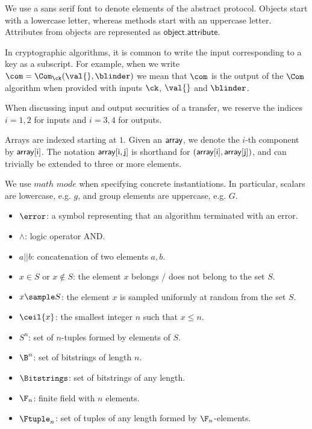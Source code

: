 
We use a \textsf{sans serif} font to denote elements of the abstract protocol. Objects start with a lowercase letter, whereas methods start with an uppercase letter. Attributes from objects are represented as $\mathsf{object.attribute}$. 

In cryptographic algorithms, it is common to write the input corresponding to a key as a subscript. For example, when we write $\com = \Com_{\ck}(\val{}, \blinder)$ we mean that $\com$ is the output of the $\Com$ algorithm when provided with inputs $\ck$, $\val{}$ and $\blinder$.

When discussing input and output securities of a transfer, we reserve the indices $i=1,2$ for inputs and $i=3,4$ for outputs.

Arrays are indexed starting at $1$. Given an $\sf{array}$, we denote the $i$-th component by $\sf{array}[i]$. The notation $\sf{array}[i, j]$ is shorthand for $(\sf{array}[i], \sf{array}[j])$, and can trivially be extended to three or more elements.

We use $math$ $mode$ when specifying concrete instantiations. In particular, scalars are lowercase, e.g. $g$, and group elements are uppercase, e.g. $G$.


\begin{itemize}
    \item $\error$: a symbol representing that an algorithm terminated with an error.
    \item $\land$: logic operator AND.
    \item $a || b$: concatenation of two elements $a, b$. 
    \item $x \in S$ or $x \not\in S$: the element $x$ belongs / does not belong to the set $S$.
    \item $x \sample S$: the element $x$ is sampled uniformly at random from the set $S$.
    \item $\ceil{x}$: the smallest integer $n$ such that $x \leq n$.
    \item $S^n$: set of $n$-tuples formed by elements of $S$.
    \item $\B^n$: set of bitstrings of length $n$.
    \item $\Bitstrings$: set of bitstrings of any length.
    \item $\F_n$: finite field with $n$ elements.
    \item $\Ftuple_n$: set of tuples of any length formed by $\F_n$-elements.
\end{itemize}